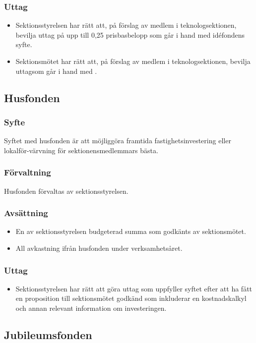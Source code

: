 \documentclass[a4paper]{dtek}
\begin{document}
\subsubsection{Uttag}
\begin{itemize}
  \item Sektionsstyrelsen har rätt att, på förslag av medlem i teknologsektionen, bevilja uttag på upp till 0,25 prisbasbelopp som går i hand med idéfondens syfte.
  \item Sektionsmötet har rätt att, på förslag av medlem i teknologsektionen, bevilja uttagsom går i hand med .
\end{itemize}

\subsection{Husfonden}
\subsubsection{Syfte}
\label{sec:husfond_syfte}
Syftet med husfonden är att möjliggöra framtida fastighetsinvestering eller lokalför-värvning för sektionensmedlemmars bästa.
\subsubsection{Förvaltning}
Husfonden förvaltas av sektionsstyrelsen.
\subsubsection{Avsättning}
\begin{itemize}
  \item En av sektionsstyrelsen budgeterad summa som godkänts av sektionsmötet.
  \item All avkastning ifrån husfonden under verksamhetsåret.
\end{itemize}
\subsubsection{Uttag}
\begin{itemize}
  \item Sektionsstyrelsen har rätt att göra uttag som uppfyller syftet efter att ha fått en proposition till sektionsmötet godkänd som inkluderar en kostnadskalkyl och annan relevant information om investeringen.
\end{itemize}
\subsection{Jubileumsfonden}
\end{document}
